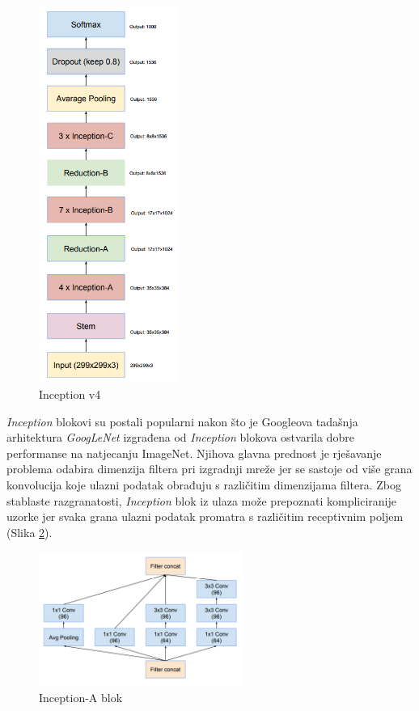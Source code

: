 \documentclass[times, utf8, proizvoljni, numeric]{fer}
\begin{document}
\begin{figure}[!ht]
	\begin{center}
		\captionsetup{justification=centering}
		\includegraphics[width=0.4\textwidth]{./imgs/inceptionv4.png}
		\caption{Inception v4 \cite{Inceptionv4}}
		\label{fg:inceptionv4}
	\end{center}
\end{figure}

\textit{Inception} blokovi su postali popularni nakon što je Googleova tadašnja arhitektura \textit{GoogLeNet} izgrađena od \textit{Inception} blokova ostvarila dobre performanse na natjecanju ImageNet. Njihova glavna prednost je rješavanje problema odabira dimenzija filtera pri izgradnji mreže jer se sastoje od više grana konvolucija koje ulazni podatak obrađuju s različitim dimenzijama filtera. Zbog stablaste razgranatosti, \textit{Inception} blok iz ulaza može prepoznati kompliciranije uzorke jer svaka grana ulazni podatak promatra s različitim receptivnim poljem (Slika \ref{fg:inception_blok_a}).
	
\begin{figure}[H]
	\begin{center}
		\captionsetup{justification=centering}
		\includegraphics[width=0.6\textwidth]{./imgs/inception_blok_a.png}
		\caption{Inception-A blok  \cite{Inceptionv4}}
		\label{fg:inception_blok_a}
	\end{center}
\end{figure}
\end{document}
